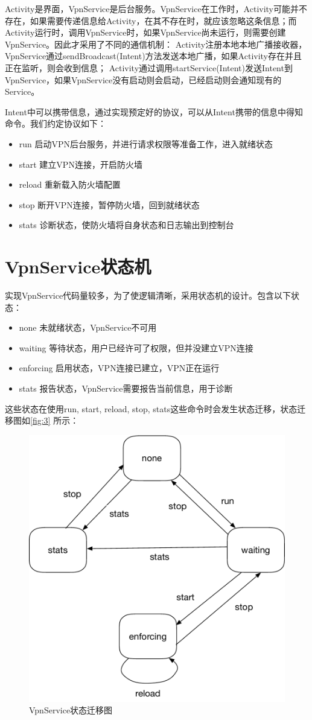 \documentclass[format=final, language=chinese, degree=bachelor]{hustthesis}
\begin{document}
Activity是界面，VpnService是后台服务。VpnService在工作时，Activity可能并不存在，如果需要传递信息给Activity，在其不存在时，就应该忽略这条信息；而Activity运行时，调用VpnService时，如果VpnService尚未运行，则需要创建VpnService。因此才采用了不同的通信机制：
Activity注册本地本地广播接收器，VpnService通过sendBroadcast(Intent)方法发送本地广播，如果Activity存在并且正在监听，则会收到信息；
Activity通过调用startService(Intent)发送Intent到VpnService，如果VpnService没有启动则会启动，已经启动则会通知现有的Service。

Intent中可以携带信息，通过实现预定好的协议，可以从Intent携带的信息中得知命令。我们约定协议如下：
\begin{itemize}
    \item run     启动VPN后台服务，并进行请求权限等准备工作，进入就绪状态
    \item start   建立VPN连接，开启防火墙
    \item reload  重新载入防火墙配置
    \item stop    断开VPN连接，暂停防火墙，回到就绪状态
    \item stats   诊断状态，使防火墙将自身状态和日志输出到控制台
\end{itemize}

\section{VpnService状态机}

实现VpnService代码量较多，为了使逻辑清晰，采用状态机的设计。包含以下状态：
\begin{itemize}
    \item none          未就绪状态，VpnService不可用
    \item waiting       等待状态，用户已经许可了权限，但并没建立VPN连接
    \item enforcing     启用状态，VPN连接已建立，VPN正在运行
    \item stats         报告状态，VpnService需要报告当前信息，用于诊断
\end{itemize}

这些状态在使用run, start, reload, stop, stats这些命令时会发生状态迁移，状态迁移图如\autoref{fig:3} 所示：

\begin{figure}[h!]
\centering
\includegraphics[width=.6\textwidth]{state_machine}
\caption{VpnService状态迁移图}\label{fig:3}
\end{figure}
\end{document}
